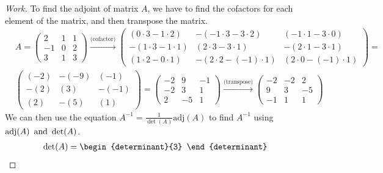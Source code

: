 \documentclass{article}
\begin{document}
\begin{proof}[Work]
  To find the adjoint of matrix $A$, we have to find the cofactors for each element of the matrix, and then transpose the matrix.
  \begin{align*}
     & A = \begin{pmatrix}
             2  & 1 & 1 \\
             -1 & 0 & 2 \\
             3  & 1 & 3
           \end{pmatrix} \xrightarrow{\text{(cofactor)}}
    \begin{pmatrix}
      (0 \cdot 3 - 1 \cdot 2)  & -(-1 \cdot 3 - 3 \cdot 2)   & (-1 \cdot 1 - 3 \cdot 0)   \\
      -(1 \cdot 3 - 1 \cdot 1) & (2 \cdot 3 - 3 \cdot 1)     & -(2 \cdot 1 - 3 \cdot 1)   \\
      (1 \cdot 2 - 0 \cdot 1)  & -(2 \cdot 2 - (-1) \cdot 1) & (2 \cdot 0 - (-1) \cdot 1)
    \end{pmatrix} = \\
     & \begin{pmatrix}
         (-2) & -(-9) & (-1)  \\
         -(2) & (3)   & -(-1) \\
         (2)  & -(5)  & (1)
       \end{pmatrix} =
    \begin{pmatrix}
      -2 & 9  & -1 \\
      -2 & 3  & 1  \\
      2  & -5 & 1
    \end{pmatrix} \xrightarrow{\text{(transpose)}}
    \begin{pmatrix}
      -2 & -2 & 2  \\
      9  & 3  & -5 \\
      -1 & 1  & 1
    \end{pmatrix}
  \end{align*}
  We can then use the equation $A^{-1} = \frac{1}{\det(A)}\text{adj}(A)$ to find $A^{-1}$ using $\operatorname{\text{adj}}(A) \operatorname{~\text{and}~} \det(A)$.
  \begin{align*}
     & \det(A) = \begin{determinant}{3}

\end{determinant}
\end{align*}
\end{proof}
\end{document}
